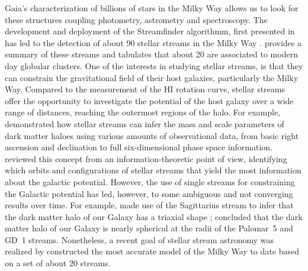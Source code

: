 \documentclass[draft]{aa}
\newcommand{\paola}[1]{\textcolor{magenta}{{#1}}}
\begin{document}
  Gaia's characterization of billions of stars in the Milky Way allows us to look for these structures coupling photometry, astrometry and spectroscopy. The development and deployment of the Streamfinder algorithmm, first presented in \citet{2018MNRAS.477.4063M} has led to the detection of about 90 stellar streams in the Milky Way \citet{2024ApJ...967...89I}. \citet{2023MNRAS.520.5225M} provides a summary of these streams and tabulates that about 20 are associated to modern day globular clusters. One of the interests in studying stellar streams, is that they can constrain the gravitational field of their host galaxies, particularly the Milky Way. Compared to the measurement of the HI rotation curve, stellar streams offer the opportunity to investigate the potential of the host galaxy over a wide range of distances, reaching the outermost regions of the halo. For example, \citet{2011MNRAS.417..198V} demonstrated how stellar streams can infer the mass and scale parameters of dark matter haloes using various amounts of observational data, from basic right ascension and declination to full six-dimensional phase space information. \citet{2018ApJ...867..101B} reviewed this concept from an information-theoretic point of view, identifying which orbits and configurations of stellar streams that yield the most information about the galactic potential. However, the use of single streams for constraining the Galactic potential has led, however, to some ambiguous and not converging results over time. For example, \citet{2010ApJ...718.1128L} made use of the Sagittarius stream to infer that the dark matter halo of our Galaxy has a triaxial shape \citep[but see also][]{2004MNRAS.351..643H, johnston05, 2005ApJ...619..807L}; \citet{2016ApJ...833...31B} concluded that the dark matter halo of our Galaxy is nearly spherical at the radii of the Palomar~5 and GD~1 streams. Nonetheless, a recent goal of stellar stream astronomy was realized by \citet{2024ApJ...967...89I} constructed the most accurate model of the Milky Way to date based on a set of about 20 streams. 


  
\end{document}
